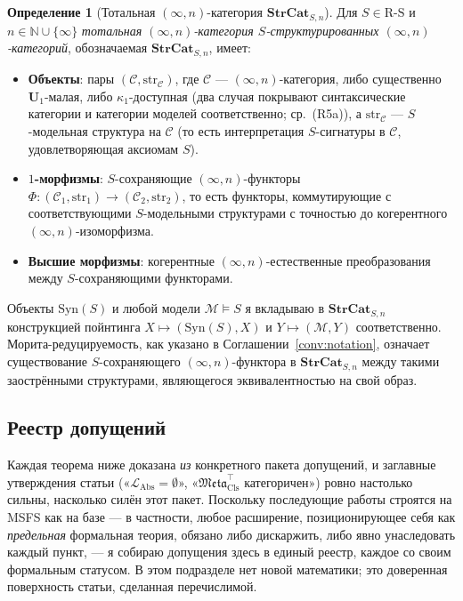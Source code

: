 \documentclass[11pt]{article}
\theoremstyle{plain}
\theoremstyle{definition}
\newtheorem{definition}[theorem]{Определение}
\newcommand{\RS}{\mathrm{R\text{-}S}}
\newcommand{\cM}{\mathcal{M}}
\newcommand{\cC}{\mathcal{C}}
\newcommand{\Meta}{\mathfrak{Meta}}
\newcommand{\LAbs}{\mathcal{L}_{\mathrm{Abs}}}
\newcommand{\Syn}{\mathrm{Syn}}
\begin{document}
\begin{definition}[Тотальная $(\infty, n)$-категория $\mathbf{StrCat}_{S, n}$]\label{def:strcat}
Для $S \in \RS$ и $n \in \mathbb{N} \cup \{\infty\}$ \emph{тотальная $(\infty, n)$-категория $S$-структурированных $(\infty, n)$-категорий}, обозначаемая $\mathbf{StrCat}_{S, n}$, имеет:
\begin{itemize}
\item \textbf{Объекты}: пары $(\cC, \mathrm{str}_\cC)$, где $\cC$ — $(\infty, n)$-категория, либо существенно $\mathbf{U}_1$-малая, либо $\kappa_1$-доступная (два случая покрывают синтаксические категории и категории моделей соответственно; ср.\ (R5a)), а $\mathrm{str}_\cC$ — $S$-модельная структура на $\cC$ (то есть интерпретация $S$-сигнатуры в $\cC$, удовлетворяющая аксиомам $S$).
\item \textbf{$1$-морфизмы}: $S$-сохраняющие $(\infty, n)$-функторы $\Phi : (\cC_1, \mathrm{str}_1) \to (\cC_2, \mathrm{str}_2)$, то есть функторы, коммутирующие с соответствующими $S$-модельными структурами с точностью до когерентного $(\infty, n)$-изоморфизма.
\item \textbf{Высшие морфизмы}: когерентные $(\infty, n)$-естественные преобразования между $S$-сохраняющими функторами.
\end{itemize}
Объекты $\Syn(S)$ и любой модели $\cM \models S$ я вкладываю в $\mathbf{StrCat}_{S, n}$ конструкцией пойнтинга $X \mapsto (\Syn(S), X)$ и $Y \mapsto (\cM, Y)$ соответственно. Морита-редуцируемость, как указано в Соглашении~\ref{conv:notation}, означает существование $S$-сохраняющего $(\infty, n)$-функтора в $\mathbf{StrCat}_{S, n}$ между такими заострёнными структурами, являющегося эквивалентностью на свой образ.
\end{definition}

\subsection{Реестр допущений}\label{sec:assumption-register}

Каждая теорема ниже доказана \emph{из} конкретного пакета допущений, и заглавные утверждения статьи («$\LAbs = \emptyset$», «$\Meta_{\mathrm{Cls}}^{\top}$ категоричен») ровно настолько сильны, насколько силён этот пакет. Поскольку последующие работы строятся на MSFS как на базе --- в частности, любое расширение, позиционирующее себя как \emph{предельная} формальная теория, обязано либо дискаржить, либо явно унаследовать каждый пункт, --- я собираю допущения здесь в единый реестр, каждое со своим формальным статусом. В этом подразделе нет новой математики; это доверенная поверхность статьи, сделанная перечислимой.
\end{document}
